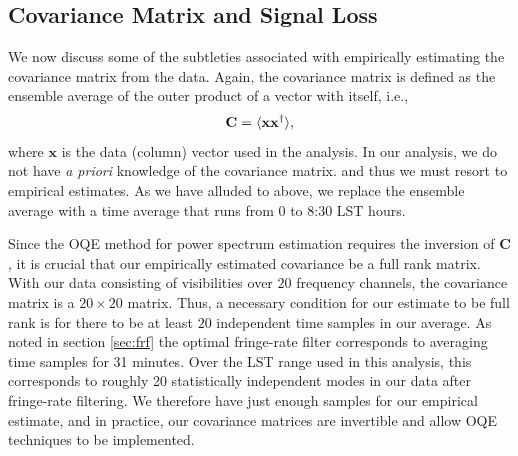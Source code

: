 \documentclass[twocolumn,numberedappendix]{emulateapj} \shorttitle{New Limits on the 21 cm Power Spectrum at $z=8.4$}
\newcommand{\x}{\mathbf{x}} \newcommand{\xhat}{\hat{\mathbf{x}}}
\newcommand{\C}{\mathbf{C}} \newcommand{\Q}{\mathbf{Q}}
\begin{document}
\subsection{Covariance Matrix and Signal Loss}
\label{sec:sigloss}
%

We now discuss some of the subtleties associated with empirically estimating the covariance matrix from
the data. Again, the covariance matrix is defined as the ensemble average of the outer
product of a vector with itself, i.e., 
\begin{equation}
    \C = \expval{\x\x^{\dagger}}, 
\end{equation}
where $\x$ is the data (column) vector used in the analysis. In our analysis,
we do not have \emph{a priori} knowledge of the covariance matrix. and thus we
must resort to empirical estimates. As we have alluded to above, we replace
the ensemble average with a time average that runs from 0 to 8:30 LST hours.

Since the OQE method for power spectrum estimation requires the inversion
of $\C$, it is crucial that our empirically estimated covariance be a full rank matrix.
With our data consisting of visibilities over $20$ frequency channels, the covariance
matrix is a $20 \times 20$ matrix. Thus, a necessary condition for our estimate to be
full rank is for there to be at least $20$ independent time samples in our average. As noted in section \ref{sec:frf} the optimal fringe-rate
filter corresponds to averaging time samples for 31 minutes. Over the LST range
used in this analysis, this corresponds to roughly 20 statistically
independent modes in our data after fringe-rate filtering. We therefore have just enough
samples for our empirical estimate, and in practice, our covariance matrices are invertible
and allow OQE techniques to be implemented.
\end{document}
